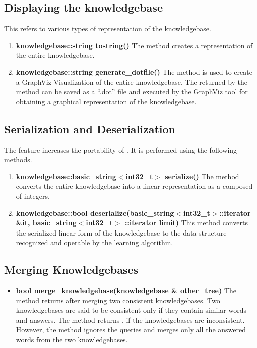 \subsection*{Displaying the knowledgebase}
This refers to various types of representation of the knowledgebase.

\begin{enumerate}

\item \textbf{knowledgebase::string tostring()} \vskip 1pt
The method creates a \stringtype representation of the entire knowledgebase.

\item \textbf{knowledgebase::string generate\_dotfile()} \vskip 1pt
The method is used to create a GraphViz Visualization of the entire knowledgebase. The \stringtype returned by the method can be saved as a ``.dot'' file and executed by the GraphViz tool for obtaining a graphical representation of the knowledgebase. 

\end {enumerate}

\subsection*{Serialization and Deserialization}
The feature increases the portability of \libalf. It is performed using the following methods.
	
\begin{enumerate}
\item \textbf{knowledgebase::basic\_string$<$int32\_t$>$ serialize()} \vskip 1pt
The method converts the entire knowledgebase into a linear representation as a \stringtype composed of integers.

\item \textbf{knowledgebase::bool deserialize(basic\_string$<$int32\_t$>$::iterator \&it, basic\_string$<$int32\_t$>$ ::iterator limit)} \vskip 1pt
This method converts the serialized linear form of the knowledgebase to the data structure recognized and operable by the learning algorithm.
\end{enumerate}	
	
\subsection*{Merging Knowledgebases}

\begin{itemize}

  \item \textbf{bool merge\_knowledgebase(knowledgebase \& other\_tree)} \vskip 1pt
  The method returns \true after merging two consistent knowledgebases. Two knowledgebases are said to be consistent only if they contain similar words and answers. The method returns \false, if the knowledgebases are inconsistent.\\
  However, the method ignores the queries and merges only all the answered words from the two knowledgebases.

\end{itemize}
 
